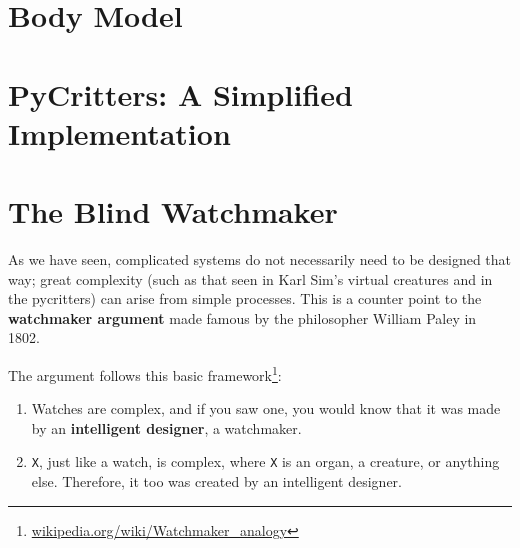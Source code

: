 \documentclass[10pt]{book}
\begin{document}


\section{Body Model}



\section{PyCritters: A Simplified Implementation}


\section{The Blind Watchmaker}


As we have seen, complicated systems do not necessarily need to be designed that
way; great complexity (such as that seen in Karl Sim's virtual creatures and in the pycritters) 
can arise from simple processes. This is a counter point to the {\bf watchmaker
argument} made famous by the philosopher William Paley in 1802. 

The argument follows this basic
framework\footnote{\url{wikipedia.org/wiki/Watchmaker_analogy}}:

\begin{enumerate}
  \item Watches are complex, and if you saw one, you would know that it was made
  by an {\bf intelligent designer}, a watchmaker.

  \item {\tt X}, just like a watch, is complex, where {\tt X} is an organ, a
  creature, or anything else. Therefore, it too was created by
  an intelligent designer.
\end{enumerate}
\end{document}
